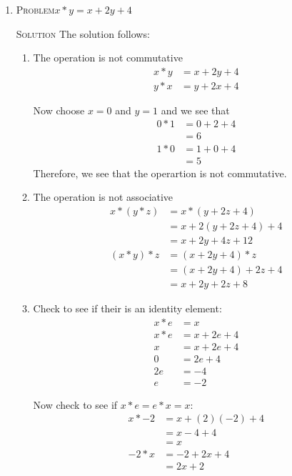 \documentclass[draft,twoside]{amsart}
\newcommand{\Solution}{\textsc{Solution}\xspace}
\newcommand{\Problem}{\textsc{Problem}\xspace}
\begin{document}
\begin{enumerate}

   \item \Problem $x*y = x + 2y + 4$ 

   \noindent \Solution The solution follows:

   \begin{enumerate}
      \item The operation is not commutative
      \begin{align*}
         x * y & = x + 2y + 4 \\
	 y * x & = y + 2x + 4
      \end{align*}

      Now choose $x=0$ and $y=1$ and we see that 
      \begin{align*}
        0 * 1 & = 0 + 2 + 4 \\
              & = 6         \\
        1 * 0 & = 1 + 0 + 4 \\
              & = 5
      \end{align*}
      Therefore, we see that the operartion is not commutative.

      \item The operation is not associative
      \begin{align*}
         x * (y * z) & = x * (y + 2z + 4) \\
	             & = x + 2(y + 2z + 4) + 4 \\
		     & = x + 2y + 4z + 12  \\
         (x * y) * z & = (x + 2y + 4) * z \\
	             & = (x + 2y + 4) + 2z + 4 \\
		     & = x + 2y + 2z + 8
      \end{align*}

      \item Check to see if their is an identity element:
      \begin{align*}
         x * e & = x           \\ 
         x * e & = x + 2e + 4  \\
	     x & = x + 2e + 4  \\
	     0 & =     2e + 4  \\
	    2e & =         -4  \\
	     e & =         -2  
      \end{align*}

      Now check to see if $x*e=e*x=x$:
      \begin{align*}
         x * -2 & = x + (2)(-2) + 4 \\
	        & = x - 4 + 4       \\
		& = x               \\
	 -2 * x & = -2 + 2x + 4     \\
	        & = 2x + 2          
      \end{align*}


\end{enumerate}
\end{enumerate}
\end{document}
